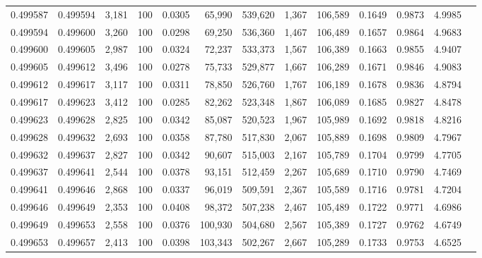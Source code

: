 \begin{tabular}{rrrrrrrrrrrrr}
0.499587 & 0.499594 & 3,181 & 100 &                                     0.0305 &  65,990 & 539,620 &   1,367 & 106,589 & 0.1649 & 0.9873 & 4.9985 \\
0.499594 & 0.499600 & 3,260 & 100 &                                     0.0298 &  69,250 & 536,360 &   1,467 & 106,489 & 0.1657 & 0.9864 & 4.9683 \\
0.499600 & 0.499605 & 2,987 & 100 &                                     0.0324 &  72,237 & 533,373 &   1,567 & 106,389 & 0.1663 & 0.9855 & 4.9407 \\
0.499605 & 0.499612 & 3,496 & 100 &                                     0.0278 &  75,733 & 529,877 &   1,667 & 106,289 & 0.1671 & 0.9846 & 4.9083 \\
0.499612 & 0.499617 & 3,117 & 100 &                                     0.0311 &  78,850 & 526,760 &   1,767 & 106,189 & 0.1678 & 0.9836 & 4.8794 \\
0.499617 & 0.499623 & 3,412 & 100 &                                     0.0285 &  82,262 & 523,348 &   1,867 & 106,089 & 0.1685 & 0.9827 & 4.8478 \\
0.499623 & 0.499628 & 2,825 & 100 &                                     0.0342 &  85,087 & 520,523 &   1,967 & 105,989 & 0.1692 & 0.9818 & 4.8216 \\
0.499628 & 0.499632 & 2,693 & 100 &                                     0.0358 &  87,780 & 517,830 &   2,067 & 105,889 & 0.1698 & 0.9809 & 4.7967 \\
0.499632 & 0.499637 & 2,827 & 100 &                                     0.0342 &  90,607 & 515,003 &   2,167 & 105,789 & 0.1704 & 0.9799 & 4.7705 \\
0.499637 & 0.499641 & 2,544 & 100 &                                     0.0378 &  93,151 & 512,459 &   2,267 & 105,689 & 0.1710 & 0.9790 & 4.7469 \\
0.499641 & 0.499646 & 2,868 & 100 &                                     0.0337 &  96,019 & 509,591 &   2,367 & 105,589 & 0.1716 & 0.9781 & 4.7204 \\
0.499646 & 0.499649 & 2,353 & 100 &                                     0.0408 &  98,372 & 507,238 &   2,467 & 105,489 & 0.1722 & 0.9771 & 4.6986 \\
0.499649 & 0.499653 & 2,558 & 100 &                                     0.0376 & 100,930 & 504,680 &   2,567 & 105,389 & 0.1727 & 0.9762 & 4.6749 \\
0.499653 & 0.499657 & 2,413 & 100 &                                     0.0398 & 103,343 & 502,267 &   2,667 & 105,289 & 0.1733 & 0.9753 & 4.6525 \\

\end{tabular}
